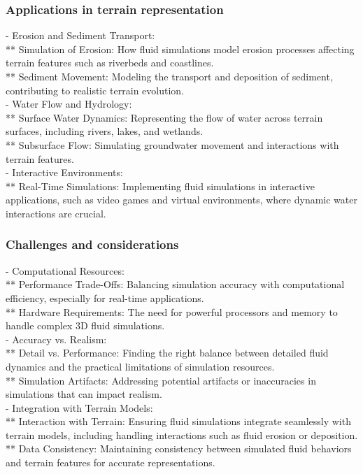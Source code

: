 \subsubsection{Applications in terrain representation}
- Erosion and Sediment Transport: \\
** Simulation of Erosion: How fluid simulations model erosion processes affecting terrain features such as riverbeds and coastlines. \\
** Sediment Movement: Modeling the transport and deposition of sediment, contributing to realistic terrain evolution. \\
- Water Flow and Hydrology: \\
** Surface Water Dynamics: Representing the flow of water across terrain surfaces, including rivers, lakes, and wetlands. \\
** Subsurface Flow: Simulating groundwater movement and interactions with terrain features. \\
- Interactive Environments: \\
** Real-Time Simulations: Implementing fluid simulations in interactive applications, such as video games and virtual environments, where dynamic water interactions are crucial. 

\subsubsection{Challenges and considerations}
- Computational Resources: \\
** Performance Trade-Offs: Balancing simulation accuracy with computational efficiency, especially for real-time applications. \\
** Hardware Requirements: The need for powerful processors and memory to handle complex 3D fluid simulations. \\
- Accuracy vs. Realism: \\
** Detail vs. Performance: Finding the right balance between detailed fluid dynamics and the practical limitations of simulation resources. \\
** Simulation Artifacts: Addressing potential artifacts or inaccuracies in simulations that can impact realism. \\
- Integration with Terrain Models: \\
** Interaction with Terrain: Ensuring fluid simulations integrate seamlessly with terrain models, including handling interactions such as fluid erosion or deposition. \\
** Data Consistency: Maintaining consistency between simulated fluid behaviors and terrain features for accurate representations. 

